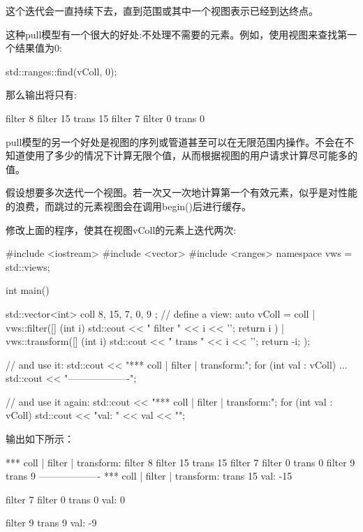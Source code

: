 这个迭代会一直持续下去，直到范围或其中一个视图表示已经到达终点。

这种pull模型有一个很大的好处:不处理不需要的元素。例如，使用视图来查找第一个结果值为0:

\begin{cpp}
std::ranges::find(vColl, 0);
\end{cpp}

那么输出将只有:

\begin{shell}
filter 8
filter 15
trans 15
filter 7
filter 0
trans 0
\end{shell}

pull模型的另一个好处是视图的序列或管道甚至可以在无限范围内操作。不会在不知道使用了多少的情况下计算无限个值，从而根据视图的用户请求计算尽可能多的值。


假设想要多次迭代一个视图。若一次又一次地计算第一个有效元素，似乎是对性能的浪费，而跳过的元素视图会在调用begin()后进行缓存。

修改上面的程序，使其在视图vColl的元素上迭代两次:


\begin{cpp}
#include <iostream>
#include <vector>
#include <ranges>
namespace vws = std::views;

int main()
{
	std::vector<int> coll{ 8, 15, 7, 0, 9 };
	// define a view:
	auto vColl = coll
	| vws::filter([] (int i) {
		std::cout << " filter " << i << '\n';
		return i %
	})
	| vws::transform([] (int i) {
		std::cout << " trans " << i << '\n';
		return -i;
	});
	
	// and use it:
	std::cout << "*** coll | filter | transform:\n";
	for (int val : vColl) {
		...
	}
	std::cout << "-------------------\n";
	
	// and use it again:
	std::cout << "*** coll | filter | transform:\n";
	for (int val : vColl) {
		std::cout << "val: " << val << "\n\n";
	}
}
\end{cpp}

输出如下所示：

\begin{shell}
*** coll | filter | transform:
filter 8
filter 15
trans 15
filter 7
filter 0
trans 0
filter 9
trans 9
-------------------
*** coll | filter | transform:
trans 15
val: -15

filter 7
filter 0
trans 0
val: 0

filter 9
trans 9
val: -9
\end{shell}

